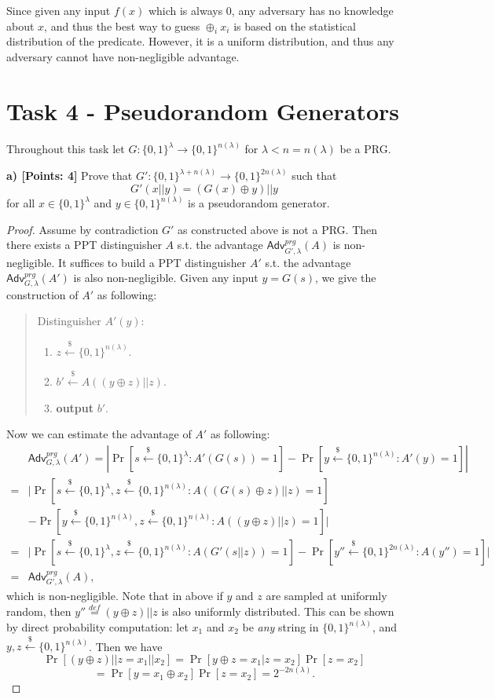 \documentclass[12pt]{article}
\newcommand{\eqdef}{\stackrel{def}{=}}
\newcommand{\bits}{\{0,1\}}
\newcommand{\getsr}{\stackrel{\$}{\gets}}
\newcommand{\Adv}{\textsf{Adv}}
\theoremstyle{definition}
\begin{document}
Since given any input $f(x)$ which is always 0, any adversary has no knowledge about $x$, and thus the best way to guess $\oplus_i x_i$ is based on the statistical distribution of the predicate. However, it is a uniform distribution, and thus any adversary cannot have non-negligible advantage.


\section{Task 4 - Pseudorandom Generators}
Throughout this task let $G : \bits^\lambda \to \bits^{n(\lambda)}$ for $\lambda<n=n(\lambda)$ be a PRG.

{\bf a) [Points: 4]} Prove that $G' : \bits^{\lambda + n(\lambda)} \to \bits^{2n(\lambda)}$ such that
$$G'(x||y) = (G(x)\oplus y)||y$$
for all $x\in\bits^\lambda$ and $y\in \bits^{n(\lambda)}$ is a pseudorandom generator.
\begin{proof}
Assume by contradiction $G'$ as constructed above is not a PRG. Then there exists a PPT distinguisher $A$ s.t. the advantage $\Adv_{G',\lambda}^{prg}(A)$ is non-negligible. It suffices to build a PPT distinguisher $A'$ s.t. the advantage $\Adv_{G,\lambda}^{prg}(A')$ is also non-negligible. Given any input $y = G(s)$, we give the construction of $A'$ as following:
\begin{quote}
Distinguisher $A'(y)$:
\begin{enumerate}
\item $z\getsr \bits^{n(\lambda)}$.
\item $b' \getsr A((y\oplus z)||z)$.
\item {\bf output} $b'$.
\end{enumerate}
\end{quote}
Now we can estimate the advantage of $A'$ as following:
$$
\begin{aligned}
&\Adv_{G,\lambda}^{prg}(A') = \left| \Pr[s\getsr\bits^\lambda : A'(G(s))=1] - \Pr[y\getsr\bits^{n(\lambda)} : A'(y)=1] \right| \\
=&\bigg| \Pr[s\getsr\bits^\lambda, z\getsr \bits^{n(\lambda)} : A((G(s)\oplus z)||z)=1]\\
 &- \Pr[y\getsr\bits^{n(\lambda)}, z\getsr \bits^{n(\lambda)} : A((y\oplus z)||z)=1] \bigg| \\
=&\bigg| \Pr[s\getsr\bits^\lambda, z\getsr \bits^{n(\lambda)} : A(G'(s||z))=1] - \Pr[y''\getsr\bits^{2n(\lambda)} : A(y'')=1] \bigg| \\
=&\Adv_{G',\lambda}^{prg}(A),
\end{aligned}
$$
which is non-negligible. Note that in above if $y$ and $z$ are sampled at uniformly random, then $y'' \eqdef (y\oplus z)||z$ is also uniformly distributed. This can be shown by direct probability computation: let $x_1$ and $x_2$ be \emph{any} string in $\bits^{n(\lambda)}$, and $y,z \getsr\bits^{n(\lambda)}$. Then we have
$$\Pr[(y\oplus z)||z = x_1||x_2] = \Pr[y\oplus z = x_1 | z=x_2]\Pr[z=x_2]$$
$$=\Pr[y = x_1\oplus x_2]\Pr[z=x_2] = 2^{-2n(\lambda)}.$$
\end{proof}
\end{document}
